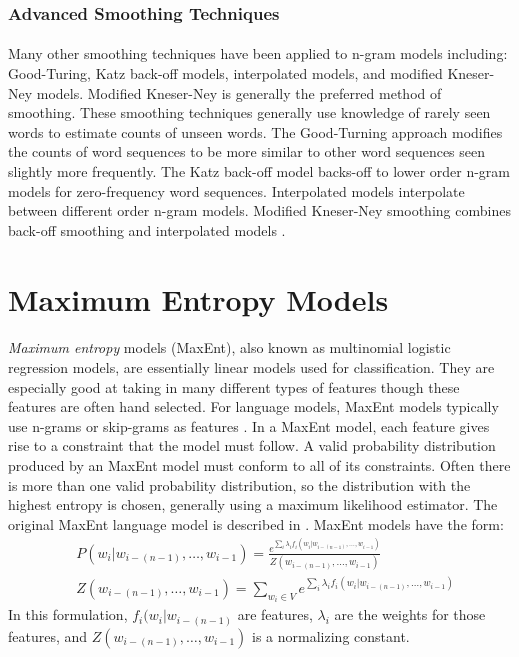 \subsubsection{Advanced Smoothing Techniques}
\paragraph{}
Many other smoothing techniques have been applied to n-gram models including: Good-Turing, Katz back-off models, interpolated models, and modified Kneser-Ney models. Modified Kneser-Ney is generally the preferred method of smoothing. These smoothing techniques generally use knowledge of rarely seen words to estimate counts of unseen words. The Good-Turning approach modifies the counts of word sequences to be more similar to other word sequences seen slightly more frequently. The Katz back-off model backs-off to lower order n-gram models for zero-frequency word sequences. Interpolated models interpolate between different order n-gram models. Modified Kneser-Ney smoothing combines back-off smoothing and interpolated models \cite{Jurafsky2009}.

\section{Maximum Entropy  Models}
\paragraph{}
\emph{Maximum entropy} models (MaxEnt), also known as multinomial logistic regression models, are essentially linear models used for classification. They are especially good at taking in many different types of features though these features are often hand selected. For language models, MaxEnt models typically use n-grams or skip-grams as features \cite{Mikolov2012}. In a MaxEnt model, each feature gives rise to a constraint that the model must follow. A valid probability distribution produced by an MaxEnt model must conform to all of its constraints. Often there is more than one valid probability distribution, so the distribution with the highest entropy is chosen, generally using a maximum likelihood estimator. The original MaxEnt language model is described in \cite{Rosenfeld1994}.
MaxEnt models have the form:
\begin{align}
&P(w_i | w_{i-(n-1)},\dots, w_{i-1}) = \frac{e^{\sum_i \lambda_i f_i(w_i | w_{i-(n-1)},\dots, w_{i-1})}}{Z(w_{i-(n-1)},
\dots, w_{i-1})} \label{eq:maxent}
\\
&Z(w_{i-(n-1)},\dots, w_{i-1}) = \sum_{w_i \in V} e^{\sum_i \lambda_i f_i(w_i | w_{i-(n-1)},\dots, w_{i-1})} \nonumber
\end{align}
In this formulation, $f_i(w_i | w_{i-(n-1)}$ are features, $\lambda_i$ are the weights for those features, and $Z(w_{i-(n-1)},\dots, w_{i-1})$ is a normalizing constant.

